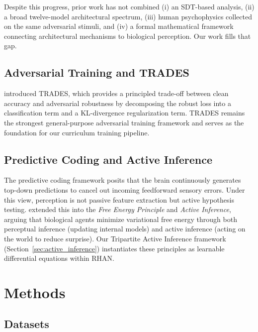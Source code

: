 \documentclass[12pt,a4paper]{article}
\begin{document}
Despite this progress, prior work has not combined (i) an SDT-based analysis,
(ii) a broad twelve-model architectural spectrum, (iii) human psychophysics
collected on the same adversarial stimuli, and (iv) a formal mathematical
framework connecting architectural mechanisms to biological perception. Our
work fills that gap.

\subsection{Adversarial Training and TRADES}

\citet{zhang2019theoretically} introduced TRADES, which provides a principled
trade-off between clean accuracy and adversarial robustness by decomposing the
robust loss into a classification term and a KL-divergence regularization
term. TRADES remains the strongest general-purpose adversarial training
framework and serves as the foundation for our curriculum training pipeline.

\subsection{Predictive Coding and Active Inference}

The predictive coding framework \citep{rao1999predictive} posits that the
brain continuously generates top-down predictions to cancel out incoming
feedforward sensory errors. Under this view, perception is not passive
feature extraction but active hypothesis testing. \citet{friston2010free}
extended this into the \textit{Free Energy Principle} and \textit{Active
Inference}, arguing that biological agents minimize variational free energy
through both perceptual inference (updating internal models) and active
inference (acting on the world to reduce surprise). Our Tripartite Active
Inference framework (Section~\ref{sec:active_inference}) instantiates these
principles as learnable differential equations within RHAN.

\section{Methods}
\label{sec:methods}

\subsection{Datasets}
\end{document}
